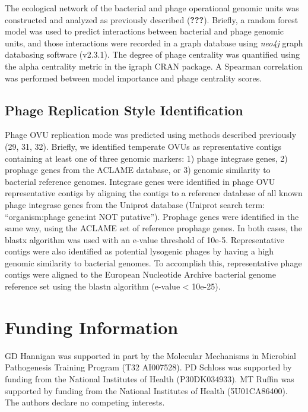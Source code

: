 \documentclass[12pt,]{article}
\begin{document}
The ecological network of the bacterial and phage operational genomic
units was constructed and analyzed as previously described
({\textbf{???}}). Briefly, a random forest model was used to predict
interactions between bacterial and phage genomic units, and those
interactions were recorded in a graph database using \emph{neo4j} graph
databasing software (v2.3.1). The degree of phage centrality was
quantified using the alpha centrality metric in the igraph CRAN package.
A Spearman correlation was performed between model importance and phage
centrality scores.

\subsection{Phage Replication Style
Identification}\label{phage-replication-style-identification}

Phage OVU replication mode was predicted using methods described
previously (29, 31, 32). Briefly, we identified temperate OVUs as
representative contigs containing at least one of three genomic markers:
1) phage integrase genes, 2) prophage genes from the ACLAME database, or
3) genomic similarity to bacterial reference genomes. Integrase genes
were identified in phage OVU representative contigs by aligning the
contigs to a reference database of all known phage integrase genes from
the Uniprot database (Uniprot search term: ``organism:phage gene:int NOT
putative''). Prophage genes were identified in the same way, using the
ACLAME set of reference prophage genes. In both cases, the blastx
algorithm was used with an e-value threshold of 10e-5. Representative
contigs were also identified as potential lysogenic phages by having a
high genomic similarity to bacterial genomes. To accomplish this,
representative phage contigs were aligned to the European Nucleotide
Archive bacterial genome reference set using the blastn algorithm
(e-value \textless{} 10e-25).

\section{Funding Information}\label{funding-information}

GD Hannigan was supported in part by the Molecular Mechanisms in
Microbial Pathogenesis Training Program (T32 AI007528). PD Schloss was
supported by funding from the National Institutes of Health
(P30DK034933). MT Ruffin was supported by funding from the National
Institutes of Health (5U01CA86400). The authors declare no competing
interests.
\end{document}
